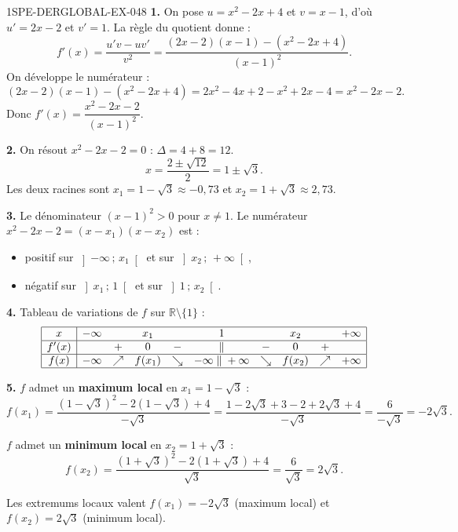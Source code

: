 \begin{corrige}{1SPE-DERGLOBAL-EX-048}
\textbf{1.} On pose $u = x^2 - 2x + 4$ et $v = x - 1$, d'où $u' = 2x - 2$ et $v' = 1$.
La règle du quotient donne :
\[
f'(x) = \frac{u'v - uv'}{v^2} = \frac{(2x-2)(x-1) - (x^2-2x+4)}{(x-1)^2}.
\]
On développe le numérateur :
\[
(2x-2)(x-1) - (x^2-2x+4) = 2x^2 - 4x + 2 - x^2 + 2x - 4 = x^2 - 2x - 2.
\]
Donc $f'(x) = \dfrac{x^2 - 2x - 2}{(x-1)^2}$.

\textbf{2.} On résout $x^2 - 2x - 2 = 0$ : $\Delta = 4 + 8 = 12$.
\[
x = \frac{2 \pm \sqrt{12}}{2} = 1 \pm \sqrt{3}.
\]
Les deux racines sont $x_1 = 1 - \sqrt{3} \approx -0{,}73$ et $x_2 = 1 + \sqrt{3} \approx 2{,}73$.

\textbf{3.} Le dénominateur $(x-1)^2 > 0$ pour $x
\neq 1$.
Le numérateur $x^2 - 2x - 2 = (x - x_1)(x - x_2)$ est :
\begin{itemize}
  \item positif sur $\left]-\infty\,;\,x_1\right[$ et sur $\left]x_2\,;\,+\infty\right[$,
  \item négatif sur $\left]x_1\,;\,1\right[$ et sur $\left]1\,;\,x_2\right[$.
\end{itemize}

\textbf{4.} Tableau de variations de $f$ sur $\mathbb{R} \setminus \{1\}$ :
\[
\begin{array}{|c|ccccccccc|}
\hline
x     & -\infty && x_1 && 1 && x_2 && +\infty \\
\hline
f'(x) &         & + & 0 & - & \| & - & 0 & + & \\
\hline
f(x)  & -\infty & \nearrow & f(x_1) & \searrow & -\infty \;\|\; +\infty & \searrow & f(x_2) & \nearrow & +\infty \\
\hline
\end{array}
\]

\textbf{5.} $f$ admet un \textbf{maximum local} en $x_1 = 1 - \sqrt{3}$ :
\[
f(x_1) = \frac{(1-\sqrt{3})^2 - 2(1-\sqrt{3}) + 4}{-\sqrt{3}}
= \frac{1 - 2\sqrt{3} + 3 - 2 + 2\sqrt{3} + 4}{-\sqrt{3}}
= \frac{6}{-\sqrt{3}} = -2\sqrt{3}.
\]

$f$ admet un \textbf{minimum local} en $x_2 = 1 + \sqrt{3}$ :
\[
f(x_2) = \frac{(1+\sqrt{3})^2 - 2(1+\sqrt{3}) + 4}{\sqrt{3}}
= \frac{6}{\sqrt{3}} = 2\sqrt{3}.
\]

Les extremums locaux valent $\boxed{f(x_1) = -2\sqrt{3}}$ (maximum local) et $\boxed{f(x_2) = 2\sqrt{3}}$ (minimum local).
\end{corrige}

